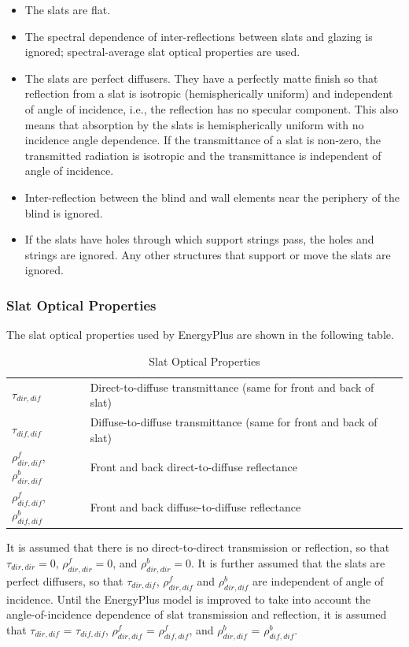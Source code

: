 \begin{itemize}
\item
  The slats are flat.
\item
  The spectral dependence of inter-reflections between slats and glazing is ignored; spectral-average slat optical properties are used.
\item
  The slats are perfect diffusers. They have a perfectly matte finish so that reflection from a slat is isotropic (hemispherically uniform) and independent of angle of incidence, i.e., the reflection has no specular component. This also means that absorption by the slats is hemispherically uniform with no incidence angle dependence. If the transmittance of a slat is non-zero, the transmitted radiation is isotropic and the transmittance is independent of angle of incidence.
\item
  Inter-reflection between the blind and wall elements near the periphery of the blind is ignored.
\item
  If the slats have holes through which support strings pass, the holes and strings are ignored. Any other structures that support or move the slats are ignored.
\end{itemize}

\subsubsection{Slat Optical Properties}\label{slat-optical-properties}

The slat optical properties used by EnergyPlus are shown in the following table.

\begin{longtable}[c]{p{1.5in}p{2.5in}}
\caption{Slat Optical Properties \label{table:slat-optical-properties}} \tabularnewline
\toprule 
\({\tau_{dir,dif}}\) & Direct-to-diffuse transmittance (same for front and back of slat) \tabularnewline
\({\tau_{dif,dif}}\) & Diffuse-to-diffuse transmittance (same for front and back of slat) \tabularnewline
\(\rho_{dir,dif}^f\), \(\rho_{dir,dif}^b\) & Front and back direct-to-diffuse reflectance \tabularnewline
\(\rho_{dif,dif}^f\), \(\rho_{dif,dif}^b\) & Front and back diffuse-to-diffuse reflectance \tabularnewline
\bottomrule
\end{longtable}

It is assumed that there is no direct-to-direct transmission or reflection, so that \({\tau_{dir,dir}} = 0\), \(\rho_{dir,dir}^f = 0\), and \(\rho_{dir,dir}^b = 0\). It is further assumed that the slats are perfect diffusers, so that \({\tau_{dir,dif}}\), \(\rho_{dir,dif}^f\) and \(\rho_{dir,dif}^b\) are independent of angle of incidence. Until the EnergyPlus model is improved to take into account the angle-of-incidence dependence of slat transmission and reflection, it is assumed that \({\tau_{dir,dif}}\) = \({\tau_{dif,dif}}\), \(\rho_{dir,dif}^f\) = \(\rho_{dif,dif}^f\), and \(\rho_{dir,dif}^b\) = \(\rho_{dif,dif}^b\).

